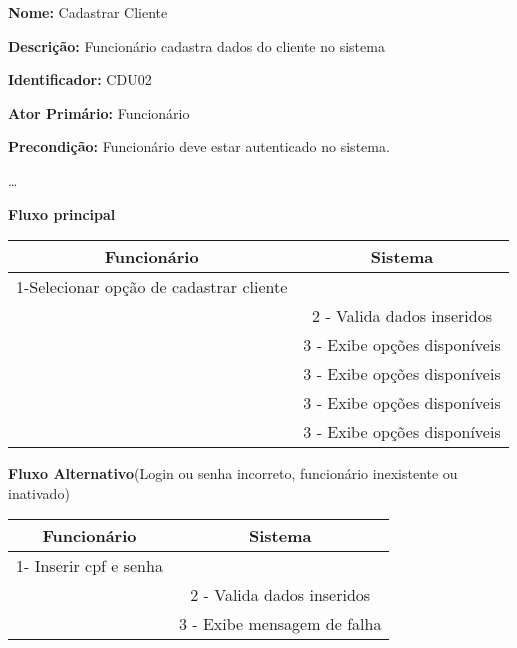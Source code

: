 	\par
	\textbf{Nome:} Cadastrar Cliente
	\par
	\textbf{Descrição:} Funcionário cadastra dados do cliente no sistema
	\par 
	\textbf{Identificador:} CDU02
	\par
	\textbf{Ator Primário:} Funcionário	
	\par
	\textbf{Precondição:} Funcionário deve estar autenticado no sistema.
	\par
	\ldots
	\par
	\textbf{Fluxo principal}\par
	\begin{tabular}{|c|c|}
		\hline 
		Funcionário & Sistema \\ 
		\hline 	
		1-Selecionar opção de cadastrar cliente &  \\ 
		\hline 
		& 
		
		2 - Valida dados inseridos 
		\\ 
		\hline 
		& 
		
		3 - Exibe opções disponíveis
		\\ 
		\hline 
		& 
		
		3 - Exibe opções disponíveis
		\\ 
		\hline 
		& 
		
		3 - Exibe opções disponíveis
		\\ 
		\hline 
		& 
		
		3 - Exibe opções disponíveis
		\\ 		
		\hline 
	\end{tabular} 
	\vspace{12px}
	\par
	\textbf{Fluxo Alternativo}(Login ou senha incorreto, funcionário inexistente ou inativado)\par
	\begin{tabular}{|c|c|}
		\hline 
		Funcionário & Sistema \\ 
		\hline 
		1- Inserir cpf e senha  &  \\ 
		\hline 
		& 
		
		2 - Valida dados inseridos 
		\\ 
		\hline 
		& 
		
		3 - Exibe mensagem de falha		
		\\ 
		\hline 
	\end{tabular} 
	\vspace{12px}

